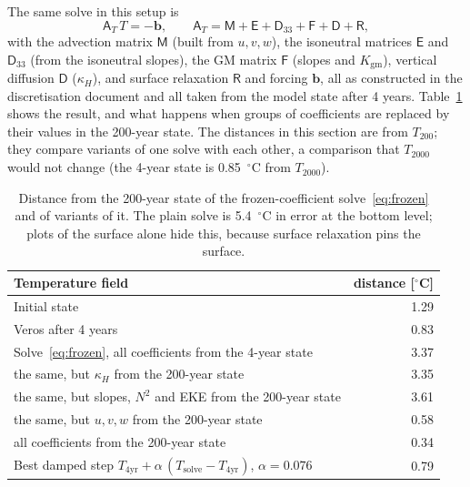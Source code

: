 \documentclass{article}
\begin{document}
The same solve in this setup is
\begin{equation}
\mathsf{A}_T\, T = -\mathbf{b}, \qquad \mathsf{A}_T = \mathsf{M} + \mathsf{E} + \mathsf{D}_{33} + \mathsf{F} + \mathsf{D} + \mathsf{R},
\label{eq:frozen}
\end{equation}
with the advection matrix $\mathsf{M}$ (built from $u,v,w$), the isoneutral matrices $\mathsf{E}$ and $\mathsf{D}_{33}$ (from the isoneutral slopes), the GM matrix $\mathsf{F}$ (slopes and $K_\text{gm}$), vertical diffusion $\mathsf{D}$ ($\kappa_H$), and surface relaxation $\mathsf{R}$ and forcing $\mathbf{b}$, all as constructed in the discretisation document and all taken from the model state after 4 years. Table~\ref{tab:swap} shows the result, and what happens when groups of coefficients are replaced by their values in the 200-year state. The distances in this section are from $T_{200}$; they compare variants of one solve with each other, a comparison that $T_{2000}$ would not change (the 4-year state is 0.85~$^\circ$C from $T_{2000}$).

\begin{table}[h]
\centering
\renewcommand{\arraystretch}{1.2}
\begin{tabular}{l|r}
\toprule
Temperature field & distance [$^\circ$C] \\
\midrule
Initial state & 1.29 \\
Veros after 4 years & 0.83 \\
\midrule
Solve~\eqref{eq:frozen}, all coefficients from the 4-year state & 3.37 \\
\quad the same, but $\kappa_H$ from the 200-year state & 3.35 \\
\quad the same, but slopes, $N^2$ and EKE from the 200-year state & 3.61 \\
\quad the same, but $u,v,w$ from the 200-year state & 0.58 \\
\quad all coefficients from the 200-year state & 0.34 \\
Best damped step $T_\text{4yr} + \alpha\,(T_\text{solve}-T_\text{4yr})$, $\alpha=0.076$ & 0.79 \\
\bottomrule
\end{tabular}
\caption{Distance from the 200-year state of the frozen-coefficient solve~\eqref{eq:frozen} and of variants of it. The plain solve is 5.4~$^\circ$C in error at the bottom level; plots of the surface alone hide this, because surface relaxation pins the surface.}
\label{tab:swap}
\end{table}
\end{document}

